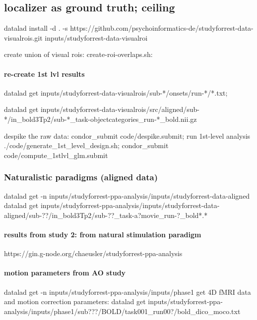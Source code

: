 \subsection{localizer as ground truth; ceiling}
%

datalad install -d . -s https://github.com/psychoinformatics-de/studyforrest-data-visualrois.git inputs/studyforrest-data-visualroi

create union of visual rois: create-roi-overlaps.sh:

\paragraph{re-create 1st lvl results}

datalad get inputs/studyforrest-data-visualrois/sub-*/onsets/run-*/*.txt;

datalad get
inputs/studyforrest-data-visualrois/src/aligned/sub-*/in\_bold3Tp2/sub-*\_task-objectcategories\_run-*\_bold.nii.gz

despike the raw data: condor\_submit code/despike.submit; run 1st-level analysis
./code/generate\_1st\_level\_design.sh; condor\_submit code/compute\_1stlvl\_glm.submit


\subsubsection{Naturalistic paradigms (aligned data)}
%
datalad get -n inputs/studyforrest-ppa-analysis/inputs/studyforrest-data-aligned
%
datalad get
inputs/studyforrest-ppa-analysis/inputs/studyforrest-data-aligned/sub-??/in\_bold3Tp2/sub-??\_task-a?movie\_run-?\_bold*.*


\paragraph{results from study 2: from natural stimulation paradigm}

%
https://gin.g-node.org/chaeusler/studyforrest-ppa-analysis



\paragraph{motion parameters from AO study}
%
datalad get -n inputs/studyforrest-ppa-analysis/inputs/phase1
%
get 4D fMRI data and motion correction parameters: datalad get
inputs/studyforrest-ppa-analysis/inputs/phase1/sub???/BOLD/task001\_run00?/bold\_dico\_moco.txt

